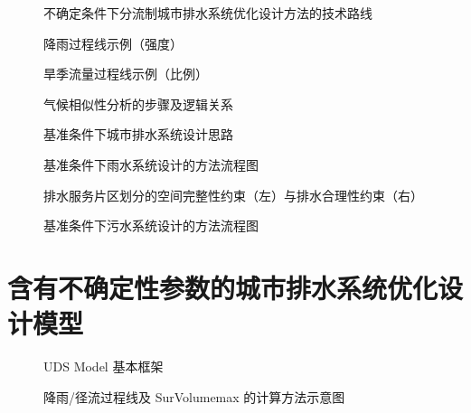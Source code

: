 \documentclass[degree=doctor]{thuthesis}
\begin{document}
\clearpage
\setcounter{page}{43}
\begin{figure}
  \centering
  \caption{不确定条件下分流制城市排水系统优化设计方法的技术路线}
\end{figure}

\clearpage
\setcounter{page}{49}
\begin{figure}
  \centering
  \caption{降雨过程线示例（强度）}
\end{figure}

\begin{figure}
  \centering
  \caption{旱季流量过程线示例（比例）}
\end{figure}

\clearpage
\setcounter{page}{52}
\begin{figure}
  \centering
  \caption{气候相似性分析的步骤及逻辑关系}
\end{figure}

\clearpage
\setcounter{page}{53}
\begin{figure}
  \centering
  \caption{基准条件下城市排水系统设计思路}
\end{figure}

\clearpage
\setcounter{page}{54}
\begin{figure}
  \centering
  \caption{基准条件下雨水系统设计的方法流程图}
\end{figure}

\clearpage
\setcounter{page}{56}
\begin{figure}
  \centering
  \caption{排水服务片区划分的空间完整性约束（左）与排水合理性约束（右）}
\end{figure}

\clearpage
\setcounter{page}{58}
\begin{figure}
  \centering
  \caption{基准条件下污水系统设计的方法流程图}
\end{figure}


\chapter{含有不确定性参数的城市排水系统优化设计模型}

\clearpage
\setcounter{page}{66}
\begin{figure}
  \centering
  \caption{UDS Model 基本框架}
\end{figure}

\clearpage
\setcounter{page}{82}
\begin{figure}
  \centering
  \caption{降雨/径流过程线及 SurVolumemax 的计算方法示意图}
\end{figure}
\end{document}
